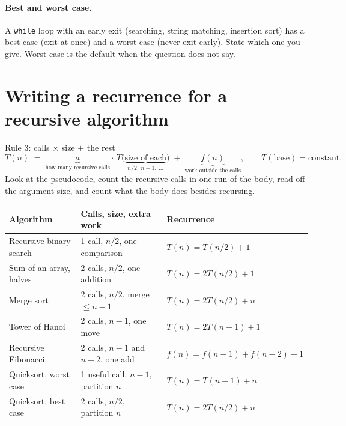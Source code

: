 \documentclass{fkt-notes}
\begin{document}
\paragraph{Best and worst case.} A \texttt{while} loop with an early exit (searching, string matching, insertion sort) has a best case (exit at once) and a worst case (never exit early). State which one you give. Worst case is the default when the question does not say.

\section{Writing a recurrence for a recursive algorithm}
\label{sec:write-rec}

\begin{rulebox}{Rule 3: calls $\times$ size $+$ the rest}
\[
T(n) \;=\; \underbrace{a}_{\text{how many recursive calls}}\cdot\, T\big(\underbrace{\text{size of each}}_{n/2,\ n-1,\ \dots}\big) \;+\; \underbrace{f(n)}_{\text{work outside the calls}},
\qquad T(\text{base}) = \text{constant}.
\]
Look at the pseudocode, count the recursive calls in one run of the body, read off the argument size, and count what the body does besides recursing.
\end{rulebox}

\begin{center}
\small
\begin{tabular}{@{}lll@{}}
\toprule
Algorithm & Calls, size, extra work & Recurrence \\
\midrule
Recursive binary search & 1 call, $n/2$, one comparison & $T(n)=T(n/2)+1$ \\
Sum of an array, halves & 2 calls, $n/2$, one addition & $T(n)=2T(n/2)+1$ \\
Merge sort & 2 calls, $n/2$, merge $\le n-1$ & $T(n)=2T(n/2)+n$ \\
Tower of Hanoi & 2 calls, $n-1$, one move & $T(n)=2T(n-1)+1$ \\
Recursive Fibonacci & 2 calls, $n-1$ and $n-2$, one add & $f(n)=f(n-1)+f(n-2)+1$ \\
Quicksort, worst case & 1 useful call, $n-1$, partition $n$ & $T(n)=T(n-1)+n$ \\
Quicksort, best case & 2 calls, $n/2$, partition $n$ & $T(n)=2T(n/2)+n$ \\
\bottomrule
\end{tabular}
\end{center}
\end{document}
